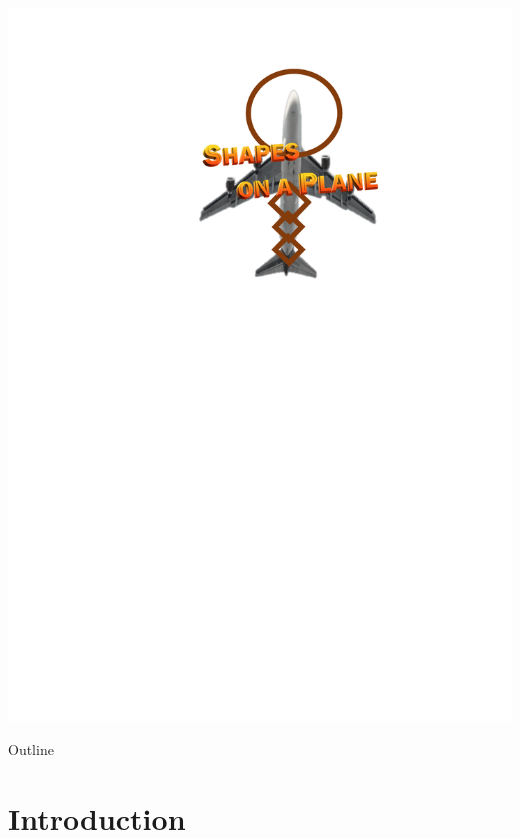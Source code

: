\documentclass[16pt, aspectratio=43,compress]{beamer}
\author{Malcolm Ramsay}
\title[Shapes on a Plane]{}
\begin{document}

\begin{frame}
    \centering
    \includegraphics[height=\textheight]{shapes-plane}
\end{frame}



\begin{frame}{Outline}
    \tableofcontents
\end{frame}

\section{Introduction}
\end{document}
